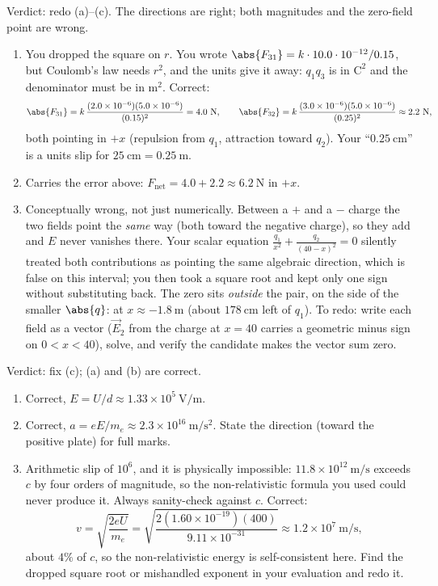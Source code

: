 
\begin{feedback}[\cref{ex:em-1}]
Verdict: redo (a)--(c). The directions are right; both magnitudes and the zero-field point are wrong.
\begin{enumerate}[label=(\alph*)]
  \item You dropped the square on $r$. You wrote $\abs{F_{31}} = k\cdot 10.0\cdot 10^{-12}/0.15$, but Coulomb's law needs $r^2$, and the units give it away: $q_1q_3$ is in $\mathrm{C^2}$ and the denominator must be in $\mathrm{m^2}$. Correct:
  \[
    \abs{F_{31}} = k\,\frac{(2.0\times 10^{-6})(5.0\times 10^{-6})}{(0.15)^2} = 4.0\ \mathrm{N},
    \qquad
    \abs{F_{32}} = k\,\frac{(3.0\times 10^{-6})(5.0\times 10^{-6})}{(0.25)^2} \approx 2.2\ \mathrm{N},
  \]
  both pointing in $+x$ (repulsion from $q_1$, attraction toward $q_2$). Your ``$0.25\ \mathrm{cm}$'' is a units slip for $25\ \mathrm{cm} = 0.25\ \mathrm{m}$.
  \item Carries the error above: $F_\text{net} = 4.0 + 2.2 \approx 6.2\ \mathrm{N}$ in $+x$.
  \item Conceptually wrong, not just numerically. Between a $+$ and a $-$ charge the two fields point the \emph{same} way (both toward the negative charge), so they add and $E$ never vanishes there. Your scalar equation $\frac{q_1}{x^2}+\frac{q_2}{(40-x)^2} = 0$ silently treated both contributions as pointing the same algebraic direction, which is false on this interval; you then took a square root and kept only one sign without substituting back. The zero sits \emph{outside} the pair, on the side of the smaller $\abs{q}$: at $x \approx -1.8\ \mathrm{m}$ (about $178\ \mathrm{cm}$ left of $q_1$). To redo: write each field as a vector ($\vec{E}_2$ from the charge at $x = 40$ carries a geometric minus sign on $0 < x < 40$), solve, and verify the candidate makes the vector sum zero.
\end{enumerate}
\end{feedback}

\begin{feedback}[\cref{ex:em-2}]
Verdict: fix (c); (a) and (b) are correct.
\begin{enumerate}[label=(\alph*)]
  \item Correct, $E = U/d \approx 1.33\times 10^{5}\ \mathrm{V/m}$.
  \item Correct, $a = eE/m_e \approx 2.3\times 10^{16}\ \mathrm{m/s^2}$. State the direction (toward the positive plate) for full marks.
  \item Arithmetic slip of $10^6$, and it is physically impossible: $11.8\times 10^{12}\ \mathrm{m/s}$ exceeds $c$ by four orders of magnitude, so the non-relativistic formula you used could never produce it. Always sanity-check against $c$. Correct:
  \[
    v = \sqrt{\frac{2eU}{m_e}} = \sqrt{\frac{2(1.60\times 10^{-19})(400)}{9.11\times 10^{-31}}} \approx 1.2\times 10^{7}\ \mathrm{m/s},
  \]
  about $4\%$ of $c$, so the non-relativistic energy is self-consistent here. Find the dropped square root or mishandled exponent in your evaluation and redo it.
\end{enumerate}
\end{feedback}

